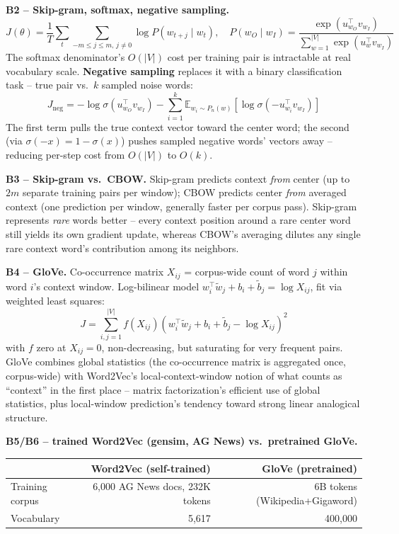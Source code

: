 \documentclass[11pt,a4paper]{article}
\begin{document}
\textbf{B2 -- Skip-gram, softmax, negative sampling.}
$$J(\theta)=\frac{1}{T}\sum_t\sum_{-m\le j\le m,\,j\ne0}\log P(w_{t+j}\mid w_t), \quad
P(w_O\mid w_I)=\frac{\exp(u_{w_O}^\top v_{w_I})}{\sum_{w=1}^{|V|}\exp(u_w^\top v_{w_I})}$$
The softmax denominator's $O(|V|)$ cost per training pair is intractable at real vocabulary
scale. \textbf{Negative sampling} replaces it with a binary classification task -- true pair
vs.\ $k$ sampled noise words:
$$J_{\text{neg}} = -\log\sigma(u_{w_O}^\top v_{w_I}) - \sum_{i=1}^{k} \mathbb{E}_{w_i\sim P_n(w)}[\log\sigma(-u_{w_i}^\top v_{w_I})]$$
The first term pulls the true context vector toward the center word; the second (via
$\sigma(-x)=1-\sigma(x)$) pushes sampled negative words' vectors away -- reducing per-step
cost from $O(|V|)$ to $O(k)$.

\textbf{B3 -- Skip-gram vs.\ CBOW.} Skip-gram predicts context \emph{from} center (up to $2m$
separate training pairs per window); CBOW predicts center \emph{from} averaged context (one
prediction per window, generally faster per corpus pass). Skip-gram represents \emph{rare}
words better -- every context position around a rare center word still yields its own
gradient update, whereas CBOW's averaging dilutes any single rare context word's contribution
among its neighbors.

\textbf{B4 -- GloVe.} Co-occurrence matrix $X_{ij}$ = corpus-wide count of word $j$ within
word $i$'s context window. Log-bilinear model $w_i^\top\tilde w_j+b_i+\tilde b_j=\log X_{ij}$,
fit via weighted least squares:
$$J=\sum_{i,j=1}^{|V|} f(X_{ij})\left(w_i^\top\tilde w_j+b_i+\tilde b_j-\log X_{ij}\right)^2$$
with $f$ zero at $X_{ij}{=}0$, non-decreasing, but saturating for very frequent pairs. GloVe
combines global statistics (the co-occurrence matrix is aggregated once, corpus-wide) with
Word2Vec's local-context-window notion of what counts as ``context'' in the first place --
matrix factorization's efficient use of global statistics, plus local-window prediction's
tendency toward strong linear analogical structure.

\textbf{B5/B6 -- trained Word2Vec (gensim, AG News) vs.\ pretrained GloVe.}

\begin{table}[H]
\centering
\begin{tabular}{lrr}
\toprule
 & \textbf{Word2Vec (self-trained)} & \textbf{GloVe (pretrained)} \\
\midrule
Training corpus & 6,000 AG News docs, 232K tokens & 6B tokens (Wikipedia+Gigaword) \\
Vocabulary & 5,617 & 400,000 \\
\bottomrule
\end{tabular}
\end{table}
\end{document}
